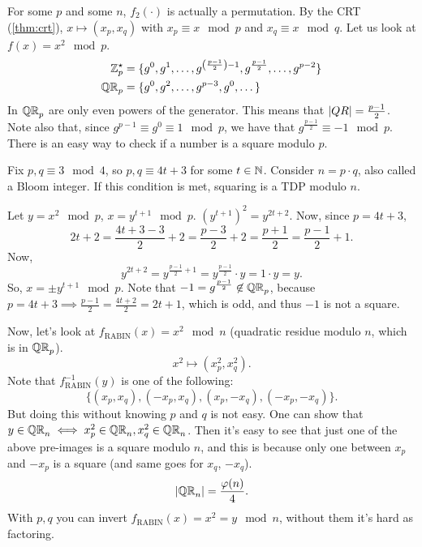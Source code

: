 For some $p$ and some $n$, $f_2(\cdot)$ is actually a permutation. 
By the \ac{CRT} (\cref{thm:crt}), $x \mapsto (x_p, x_q)$ with $x_p \equiv x \mod p$ and $x_q \equiv x \mod q$.
Let us look at $f(x) = x^2 \mod p$.
\begin{align*}
	\Integers_p^{\star} & = \{
		g^0, g^1, \dots, g^{\left(\frac{p-1}{2}\right) - 1}, g^{\frac{p-1}{2}}, \dots, g^{p-2}
	\} \\
	\QR & = \{
		g^0, g^2, \dots, g^{p-3}, g^0, \dots
	\}
\end{align*}
In $\QR$ are only even powers of the generator.
This means that $\abs{QR} = \frac{p-1}{2}$.
Note also that, since $g^{p-1} \equiv g^0 \equiv 1 \mod p$, we have that $g^{\frac{p-1}{2}} \equiv -1 \mod p$.
There is an easy way to check if a number is a square modulo $p$.

Fix $p, q \equiv 3 \mod 4$, so $p, q \equiv 4 t + 3$ for some $t \in \NaturalsZ$.
Consider $n = p \cdot q$, also called a Bloom integer.
If this condition is met, squaring is a \ac{TDP} modulo $n$.

Let $y = x^2 \mod p$, $x = y^{t+1} \mod p$.
$\left(y^{t+1}\right)^2 = y^{2t+2}$.
Now, since $p = 4t + 3$,
\begin{equation*}
	2t + 2 =
	\frac{4t + 3 - 3}{2} + 2 =
	\frac{p-3}{2} + 2 =
	\frac{p+1}{2} =
	\frac{p - 1}{2} + 1.
\end{equation*}
Now,
\begin{equation*}
	y^{2t+2} =
	y^{\frac{p-1}{2} + 1} =
	y^{\frac{p-1}{2}} \cdot y =
	1 \cdot y = y.
\end{equation*}
So, $x = \pm y^{t+1} \mod p$.
Note that $-1 = g^{\frac{p-1}{2}} \not\in \QR$, because $p = 4t + 3 \implies \frac{p-1}{2} = \frac{4t + 2}{2} = 2t+1$, which is odd, and thus $-1$ is not a square.

Now, let's look at $f_{\mathrm{RABIN}}(x) = x^2 \mod n$ (quadratic residue modulo $n$, which is in $\QR$).
\begin{equation*}
	x^2 \mapsto (x_p^2, x_q^2).
\end{equation*}
Note that $f_{\mathrm{RABIN}}^{-1}(y)$ is one of the following:
\begin{equation*}
	\{ (x_p, x_q), (-x_p, x_q), (x_p, -x_q), (-x_p, -x_q) \}.
\end{equation*}
But doing this without knowing $p$ and $q$ is not easy.
One can show that $y \in \QR[n] \iff x^2_p \in \QR[n], x^2_q \in \QR[n]$.
Then it's easy to see that just one of the above pre-images is a square modulo $n$, and this is because only one between $x_p$ and $-x_p$ is a square (and same goes for $x_q$, $-x_q$).
\begin{equation*}
	\abs{\QR[n]} = \frac{\varphi(n)}{4}.
\end{equation*}
With $p, q$ you can invert $f_{\mathrm{RABIN}}(x) = x^2 = y \mod n$, without them it's hard as factoring.

